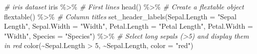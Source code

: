 \documentclass[
  12pt,
  american,
  a4paper,
  extrafontsizes,onecolumn,openright
  ]{memoir}
\newenvironment{Shaded}{\begin{snugshade}}{\end{snugshade}}
\newcommand{\AttributeTok}[1]{\textcolor[rgb]{0.77,0.63,0.00}{#1}}
\newcommand{\CommentTok}[1]{\textcolor[rgb]{0.56,0.35,0.01}{\textit{#1}}}
\newcommand{\DecValTok}[1]{\textcolor[rgb]{0.00,0.00,0.81}{#1}}
\newcommand{\FunctionTok}[1]{\textcolor[rgb]{0.00,0.00,0.00}{#1}}
\newcommand{\NormalTok}[1]{#1}
\newcommand{\SpecialCharTok}[1]{\textcolor[rgb]{0.00,0.00,0.00}{#1}}
\newcommand{\StringTok}[1]{\textcolor[rgb]{0.31,0.60,0.02}{#1}}
\begin{document}
\begin{Shaded}
\begin{Highlighting}[]
\CommentTok{\# iris dataset}
\NormalTok{iris }\SpecialCharTok{\%\textgreater{}\%}
    \CommentTok{\# First lines}
\FunctionTok{head}\NormalTok{() }\SpecialCharTok{\%\textgreater{}\%}
    \CommentTok{\# Create a flextable object}
\FunctionTok{flextable}\NormalTok{() }\SpecialCharTok{\%\textgreater{}\%}
    \CommentTok{\# Column titles}
\FunctionTok{set\_header\_labels}\NormalTok{(}\AttributeTok{Sepal.Length =} \StringTok{"Sepal Length"}\NormalTok{, }\AttributeTok{Sepal.Width =} \StringTok{"Width"}\NormalTok{,}
    \AttributeTok{Petal.Length =} \StringTok{"Petal Length"}\NormalTok{, }\AttributeTok{Petal.Width =} \StringTok{"Width"}\NormalTok{, }\AttributeTok{Species =} \StringTok{"Species"}\NormalTok{) }\SpecialCharTok{\%\textgreater{}\%}
    \CommentTok{\# Select long sepals (\textgreater{}5) and display them in red}
\FunctionTok{color}\NormalTok{(}\SpecialCharTok{\textasciitilde{}}\NormalTok{Sepal.Length }\SpecialCharTok{\textgreater{}} \DecValTok{5}\NormalTok{, }\SpecialCharTok{\textasciitilde{}}\NormalTok{Sepal.Length, }\AttributeTok{color =} \StringTok{"red"}\NormalTok{)}
\end{Highlighting}
\end{Shaded}

\providecommand{\docline}[3]{\noalign{\global\setlength{\arrayrulewidth}{#1}}\arrayrulecolor[HTML]{#2}\cline{#3}}

\setlength{\tabcolsep}{2pt}

\renewcommand*{\arraystretch}{1.5}
\end{document}
